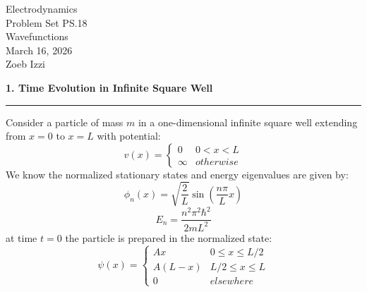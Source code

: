 \documentclass{article}
\begin{document}
\thispagestyle{plain}

\begin{center}
    {\Large Electrodynamics}\\
    {\Large Problem Set PS.18}\\
    \vspace{0.2cm}
    Wavefunctions\\
    March 16, 2026\\
    Zoeb Izzi
\end{center}

\vspace{0.5cm}

\noindent \textbf{1. Time Evolution in Infinite Square Well}
\hrule
\vspace{0.3cm}

\noindent Consider a particle of mass $m$ in a one-dimensional infinite square well extending from $x = 0$ to $x = L$ with potential:
\[ v(x) = \begin{cases} 0 & 0 < x < L \\ \infty & otherwise \end{cases} \]
We know the normalized stationary states and energy eigenvalues are given by:
\[ \phi_n(x) = \sqrt{\frac{2}{L}} \sin\left(\frac{n\pi}{L}x\right) \]
\[ E_n = \frac{n^2\pi^2\hbar^2}{2mL^2} \]
at time $t = 0$ the particle is prepared in the normalized state:
\[ \psi(x) = \begin{cases} Ax & 0 \le x \le L/2 \\ A(L - x) & L/2 \le x \le L \\ 0 & elsewhere \end{cases} \]
\end{document}
